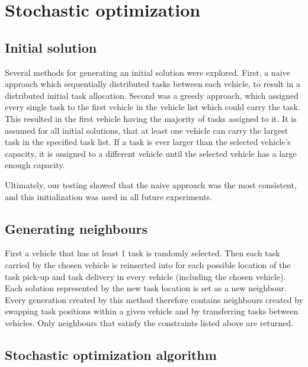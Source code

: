 \documentclass[11pt]{article}
\begin{document}
\section{Stochastic optimization}

\subsection{Initial solution}
Several methods for generating an initial solution were explored. First, a naive approach which sequentially distributed tasks between each vehicle, to result in a distributed initial task allocation. Second was a greedy approach, which assigned every single task to the first vehicle in the vehicle list which could carry the task. This resulted in the first vehicle having the majority of tasks assigned to it. It is assumed for all initial solutions, that at least one vehicle can carry the largest task in the specified task list. If a task is ever larger than the selected vehicle's capacity, it is assigned to a different vehicle until the selected vehicle has a large enough capacity.

Ultimately, our testing showed that the naive approach was the most consistent, and this initialization was used in all future experiments. 

\subsection{Generating neighbours}
First a vehicle that has at least 1 task is randomly selected. Then each task carried by the chosen vehicle is reinserted into for each possible location of the task pick-up and task delivery in every vehicle (including the chosen vehicle). Each solution represented by the new task location is set as a new neighbour. Every generation created by this method therefore contains neighbours created by swapping task positions within a given vehicle and by transferring tasks between vehicles. Only neighbours that satisfy the constraints listed above are returned. 

\subsection{Stochastic optimization algorithm}
\end{document}
